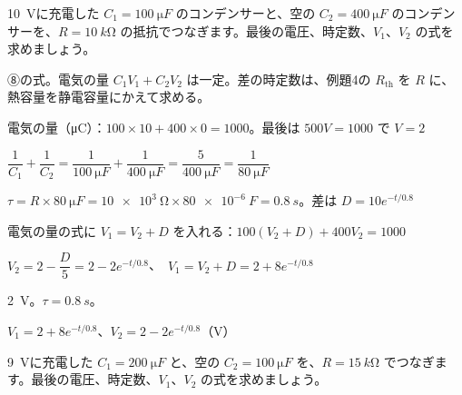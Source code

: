 \begin{reidai}[2つのコンデンサー]
\qty{10}{V}に充電した $C_1=\qty{100}{\micro F}$ のコンデンサーと、空の $C_2=\qty{400}{\micro F}$ のコンデンサーを、$R=\qty{10}{k\ohm}$ の抵抗でつなぎます。最後の電圧、時定数、$V_1$、$V_2$ の式を求めましょう。\par
\kangaekata ⑧の式。電気の量 $C_1V_1+C_2V_2$ は一定。差の時定数は、例題4の $R_{\mathrm{th}}$ を $R$ に、熱容量を静電容量にかえて求める。\par
\shiki\kvios{}\zw{} 電気の量（\unit{\micro C}）：$100\times10+400\times0=1000$。最後は $500V=1000$ で $V=2$\par
\kvioa $\dfrac{1}{C_1}+\dfrac{1}{C_2}=\dfrac{1}{\qty{100}{\micro F}}+\dfrac{1}{\qty{400}{\micro F}}=\dfrac{5}{\qty{400}{\micro F}}=\dfrac{1}{\qty{80}{\micro F}}$\par
\kvioa $\tau=R\times\qty{80}{\micro F}=\qty{10e3}{\ohm}\times\qty{80e-6}{F}=\qty{0.8}{s}$。差は $D=10e^{-t/0.8}$\par
\kvioa 電気の量の式に $V_1=V_2+D$ を入れる：$100(V_2+D)+400V_2=1000$\par
\kviob $V_2=2-\dfrac{D}{5}=2-2e^{-t/0.8}$、\ $V_1=V_2+D=2+8e^{-t/0.8}$\par
\kotae\kvios{}\zw{} \qty{2}{V}。$\tau=\qty{0.8}{s}$。\par
\kvioa $V_1=2+8e^{-t/0.8}$、$V_2=2-2e^{-t/0.8}$（V）
\end{reidai}

\begin{jibun}
\qty{9}{V}に充電した $C_1=\qty{200}{\micro F}$ と、空の $C_2=\qty{100}{\micro F}$ を、$R=\qty{15}{k\ohm}$ でつなぎます。最後の電圧、時定数、$V_1$、$V_2$ の式を求めましょう。
\end{jibun}



